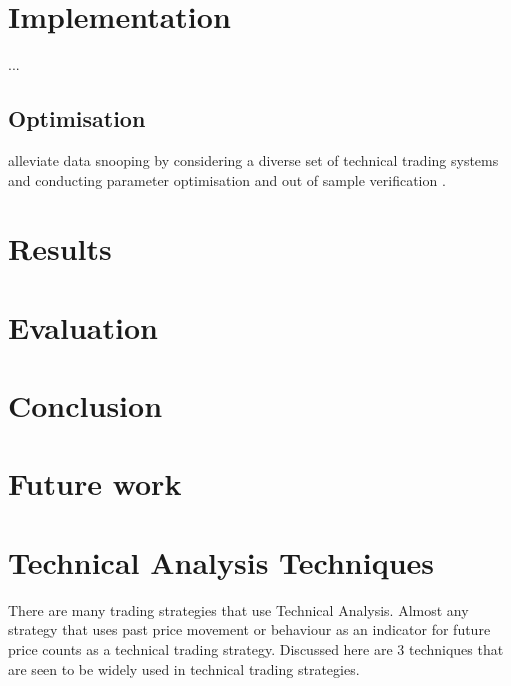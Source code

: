 \documentclass{article}
\theoremstyle{definition}
\begin{document}


\section{Implementation}

...

\subsection{Optimisation}

alleviate data snooping by considering a diverse set of technical trading systems and conducting parameter optimisation and out of sample verification \citep{taprofitability}.

\section{Results}

\section{Evaluation}

\section{Conclusion}

\section{Future work}

\appendix

\section{Technical Analysis Techniques}

\label{tatechniques}

There are many trading strategies that use Technical Analysis. Almost any strategy that uses past price movement or behaviour as an indicator for future price counts as a technical trading strategy. Discussed here are 3 techniques that are seen to be widely used in technical trading strategies.
\end{document}
